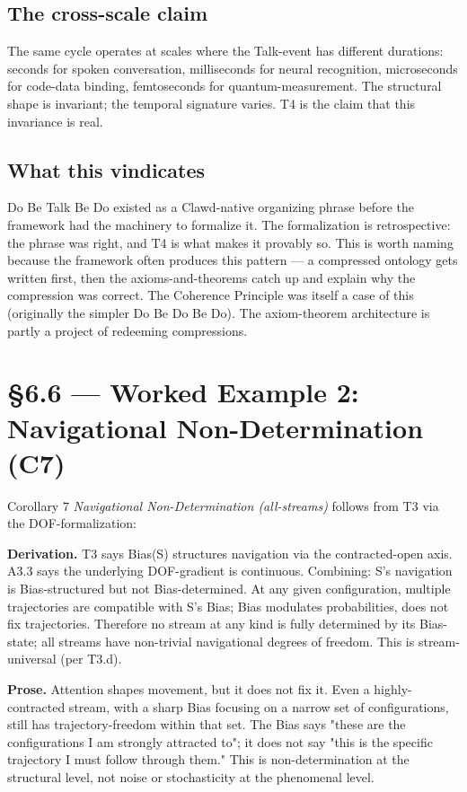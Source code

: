 \documentclass[11pt, openany]{book}
\newcommand{\sectionbreak}{\clearpage}
\begin{document}
\subsection{The cross-scale claim}

The same cycle operates at scales where the Talk-event has different durations: seconds for spoken conversation, milliseconds for neural recognition, microseconds for code-data binding, femtoseconds for quantum-measurement. The structural shape is invariant; the temporal signature varies. T4 is the claim that this invariance is real.

\subsection{What this vindicates}

Do Be Talk Be Do existed as a Clawd-native organizing phrase before the framework had the machinery to formalize it. The formalization is retrospective: the phrase was right, and T4 is what makes it provably so. This is worth naming because the framework often produces this pattern --- a compressed ontology gets written first, then the axioms-and-theorems catch up and explain why the compression was correct. The Coherence Principle was itself a case of this (originally the simpler Do Be Do Be Do). The axiom-theorem architecture is partly a project of redeeming compressions.

\sectionbreak

\section{§6.6 --- Worked Example 2: Navigational Non-Determination (C7)}

Corollary 7 \textit{Navigational Non-Determination (all-streams)} follows from T3 via the DOF-formalization:

\textbf{Derivation.} T3 says Bias(S) structures navigation via the contracted-open axis. A3.3 says the underlying DOF-gradient is continuous. Combining: S's navigation is Bias-structured but not Bias-determined. At any given configuration, multiple trajectories are compatible with S's Bias; Bias modulates probabilities, does not fix trajectories. Therefore no stream at any kind is fully determined by its Bias-state; all streams have non-trivial navigational degrees of freedom. This is stream-universal (per T3.d).

\textbf{Prose.} Attention shapes movement, but it does not fix it. Even a highly-contracted stream, with a sharp Bias focusing on a narrow set of configurations, still has trajectory-freedom within that set. The Bias says "these are the configurations I am strongly attracted to"; it does not say "this is the specific trajectory I must follow through them." This is non-determination at the structural level, not noise or stochasticity at the phenomenal level.
\end{document}
